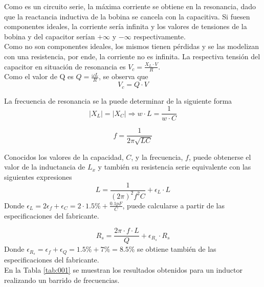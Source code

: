\documentclass[a4paper,10pt]{article}
\begin{document}
		\indent Como es un circuito serie, la máxima corriente se obtiene en 
		la resonancia, dado que la reactancia inductiva de la bobina se 
		cancela con la capacitiva. Si fuesen componentes ideales, la corriente
		sería infinita y los valores de tensiones de la bobina y del capacitor
		serían $+\infty$ y $-\infty$ respectivamente. \\
		\indent Como no son componentes ideales, los mismos tienen pérdidas y
		se las modelizan con una resistencia, por ende, la corriente no es 
		infinita. La respectiva tensión del capacitor en situación de 
		resonancia es $V_c = \frac{X_L\cdot V}{R}$. \\
		\indent Como el valor de Q es $Q=\frac{\omega L}{R}$, se observa que 
		$$V_c = Q \cdot V$$

		\indent La frecuencia de resonancia se la puede determinar de la 
		siguiente forma
		$$|X_L|=|X_C| \Rightarrow w\cdot L = \frac{1}{w\cdot C}$$

		$$f=\frac{1}{2\pi\sqrt{LC}}$$ 
		
		\indent Conocidos los valores de la capacidad, $C$, y la frecuencia, 
		$f$, puede obtenerse el valor de la inductancia de $L_x$ y tambi\'en 
		su resistencia serie equivalente con las siguientes expresiones
		$$L=\frac{1}{(2\pi)^2 f^2C}+\epsilon_L\cdot L$$
		Donde $\epsilon_L=2\epsilon_f+\epsilon_C=2\cdot 1.5\%+\frac{0.1pF}{C}$, 
		puede calcularse a partir de las especificaciones del  fabricante.
		
		$$R_s=\frac{2\pi\cdot f\cdot L}{Q}+\epsilon_{R_s}\cdot R_s$$
		Donde $\epsilon_{R_s}=\epsilon_f+\epsilon_Q= 1.5\%+ 7\%=8.5\%$ se 
		obtiene tambi\'en de las especificaciones del fabricante.
		\\
		\indent En la Tabla \ref{tab:001} se muestran los resultados obtenidos
		para un inductor realizando un barrido de frecuencias.
		
\end{document}
